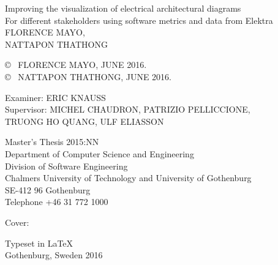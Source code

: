 \vspace*{3.5cm}
Improving the visualization of electrical architectural diagrams\\
For different stakeholders using software metrics and data from Elektra\\[0.2cm]
FLORENCE MAYO, \\
NATTAPON THATHONG \setlength{\parskip}{1cm}

\copyright ~ FLORENCE MAYO, JUNE 2016. \\
\copyright ~ NATTAPON THATHONG, JUNE 2016.\setlength{\parskip}{1cm}

Examiner: ERIC KNAUSS \\
Supervisor: MICHEL CHAUDRON, PATRIZIO PELLICCIONE, \\ TRUONG HO QUANG, ULF ELIASSON
\setlength{\parskip}{1cm}

Master's Thesis 2015:NN\\	%
Department of Computer Science and Engineering\\
Division of Software Engineering\\
Chalmers University of Technology and University of Gothenburg\\
SE-412 96 Gothenburg\\
Telephone +46 31 772 1000 \setlength{\parskip}{0.5cm}

\vfill
Cover: \todo{[to be filled in]} \setlength{\parskip}{0.5cm}

Typeset in \LaTeX \\
Gothenburg, Sweden 2016

